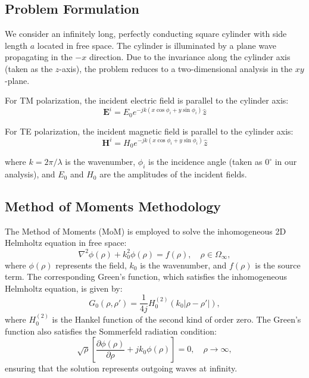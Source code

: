 \documentclass[10pt,a4paper]{article}
\begin{document}
\subsection{Problem Formulation}

We consider an infinitely long, perfectly conducting square cylinder with side length $a$ located in free space. The cylinder is illuminated by a plane wave propagating in the $-x$ direction. Due to the invariance along the cylinder axis (taken as the $z$-axis), the problem reduces to a two-dimensional analysis in the $xy$-plane.

For TM polarization, the incident electric field is parallel to the cylinder axis:
\begin{equation}
\mathbf{E}^i = E_0 e^{-jk(x\cos\phi_i + y\sin\phi_i)}\hat{z}
\end{equation}

For TE polarization, the incident magnetic field is parallel to the cylinder axis:
\begin{equation}
\mathbf{H}^i = H_0 e^{-jk(x\cos\phi_i + y\sin\phi_i)}\hat{z}
\end{equation}

where $k = 2\pi/\lambda$ is the wavenumber, $\phi_i$ is the incidence angle (taken as $0^\circ$ in our analysis), and $E_0$ and $H_0$ are the amplitudes of the incident fields.

\subsection{Method of Moments Methodology}
The Method of Moments (MoM) is employed to solve the inhomogeneous 2D Helmholtz equation in free space:
\begin{equation}
\nabla^2 \phi(\rho) + k_0^2 \phi(\rho) = f(\rho), \quad \rho \in \Omega_\infty,
\end{equation}
where $\phi(\rho)$ represents the field, $k_0$ is the wavenumber, and $f(\rho)$ is the source term. The corresponding Green's function, which satisfies the inhomogeneous Helmholtz equation, is given by:
\begin{equation}
G_0(\rho, \rho') = \frac{1}{4j} H_0^{(2)}(k_0 |\rho - \rho'|),
\end{equation}
where $H_0^{(2)}$ is the Hankel function of the second kind of order zero. The Green's function also satisfies the Sommerfeld radiation condition:
\begin{equation}
\sqrt{\rho} \left[ \frac{\partial \phi(\rho)}{\partial \rho} + j k_0 \phi(\rho) \right] = 0, \quad \rho \to \infty,
\end{equation}
ensuring that the solution represents outgoing waves at infinity.
\end{document}
